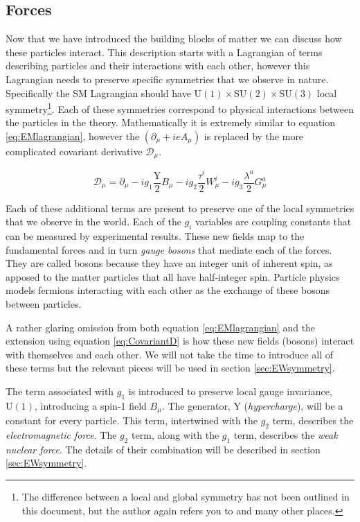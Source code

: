 \subsection{Forces}
\label{sec:TheForces}

Now that we have introduced the building blocks of matter we can discuss how these particles interact. This description starts with a Lagrangian of terms describing particles and their interactions with each other, however this Lagrangian needs to preserve specific symmetries that we observe in nature. Specifically the SM Lagrangian should have $\mathrm{U}(1) \times \mathrm{SU}(2) \times \mathrm{SU}(3)$ local symmetry\footnote{The difference between a local and global symmetry has not been outlined in this document, but the author again refers you to \cite{Armstrong:1988,Miller:1972,Oliver:1993,Tung:1985} and many other places.}. Each of these symmetries correspond to physical interactions between the particles in the theory. Mathematically it is extremely similar to equation \eqref{eq:EMlagrangian}, however the $\left(\partial_{\mu} + ieA_{\mu}\right)$ is replaced by the more complicated covariant derivative $\mathcal{D}_{\mu}$.

\begin{equation}
\label{eq:CovariantD}
\mathcal{D}_{\mu} = \partial_{\mu} - i g_{1} \frac{\mathrm{Y}}{2}B_{\mu} - i g_{2} \frac{\tau^{i}}{2}W^{i}_{\mu} - i g_{3} \frac{\lambda^{a}}{2}G^{a}_{\mu}
\end{equation}

Each of these additional terms are present to preserve one of the local symmetries that we observe in the world. Each of the $g_{i}$ variables are coupling constants that can be measured by experimental results. These new fields map to the fundamental forces and in turn \textit{gauge bosons} that mediate each of the forces. They are called bosons because they have an integer unit of inherent spin, as apposed to the matter particles that all have half-integer spin. Particle physics models fermions interacting with each other as the exchange of these bosons between particles.

A rather glaring omission from both equation \eqref{eq:EMlagrangian} and the extension using equation \eqref{eq:CovariantD} is how these new fields (bosons) interact with themselves and each other. We will not take the time to introduce all of these terms but the relevant pieces will be used in section \ref{sec:EWsymmetry}.

The term associated with $g_{1}$ is introduced to preserve local gauge invariance, $\mathrm{U}(1)$, introducing a spin-1 field $B_{\mu}$. The generator, $\mathrm{Y}$ (\textit{hypercharge}), will be a constant for every particle. This term, intertwined with the $g_{2}$ term, describes the \textit{electromagnetic force}. The $g_{2}$ term, along with the $g_{1}$ term, describes the \textit{weak nuclear force}. The details of their combination will be described in section \ref{sec:EWsymmetry}. 

